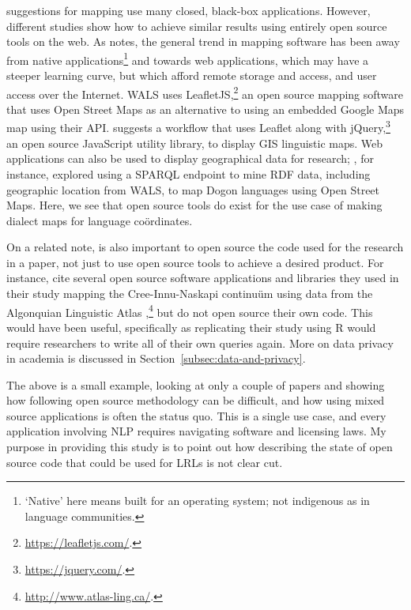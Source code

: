  suggestions for mapping use many closed, black-box applications. However, different studies show how to achieve similar results using entirely open source tools on the web. As \citet{hu2012multimedia, hu2018web} notes, the general trend in mapping software has been away from native applications\footnote{`Native' here means built for an operating system; not indigenous as in language communities.} and towards web applications, which may have a steeper learning curve, but which afford remote storage and access, and user access over the Internet. WALS uses LeafletJS,\footnote{\href{https://leafletjs.com/}{https://leafletjs.com/}. } an open source mapping software that uses Open Street Maps as an alternative to using an embedded Google Maps map using their API. \citet{hu2018web} suggests a workflow that uses Leaflet along with jQuery,\footnote{\href{https://jquery.com/}{https://jquery.com/}. } an open source JavaScript utility library, to display GIS linguistic maps. Web applications can also be used to display geographical data for research; \citet{littauer2013linguistic}, for instance, explored using a SPARQL endpoint to mine RDF data, including geographic location from WALS, to map Dogon languages using Open Street Maps. Here, we see that open source tools do exist for the use case of making dialect maps for language co\"ordinates.

On a related note, is also important to open source the code used for the research in a paper, not just to use open source tools to achieve a desired product. For instance, \citet{cenerini2017mapping} cite several open source software applications and libraries they used in their study mapping the Cree-Innu-Naskapi continu\"{u}m using data from the Algonquian Linguistic Atlas \citep{junker2011linguistic},\footnote{\href{http://www.atlas-ling.ca/}{http://www.atlas-ling.ca/}. } but do not open source their own code. This would have been useful, specifically as replicating their study using R \citep{ihaka1996r} would require researchers to write all of their own queries again. More on data privacy in academia is discussed in Section~\ref{subsec:data-and-privacy}.

The above is a small example, looking at only a couple of papers and showing how following open source methodology can be difficult, and how using mixed source applications is often the status quo. This is a single use case, and every application involving NLP requires navigating software and licensing laws. My purpose in providing this study is to point out how describing the state of open source code that could be used for LRLs is not clear cut.

